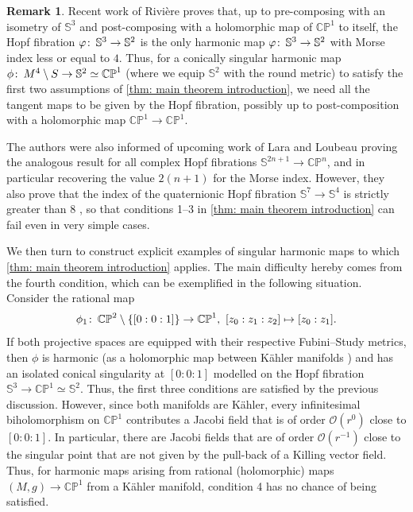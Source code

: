 \documentclass{article}
\numberwithin{equation}{section}        %
\theoremstyle{bfnote}
\theoremstyle{definition}
\theoremstyle{bfremark}
\newtheorem{rem}[thm]{Remark}               %
\newcommand{\col}{\colon \thinspace}        %
\newcommand{\Sp}{\mathbb{S}}                %
\begin{document}
\begin{rem}
    Recent work of Rivière \cite{Riviere2023HarmonicMapsS3toS2} proves that, up to pre-composing with an isometry of $\Sp^3$ and post-composing with a holomorphic map of $\mathbb{CP}^1$ to itself, the Hopf fibration $\varphi\col \Sp^3 \to \Sp^2$ is the only harmonic map $\varphi \col \Sp^3 \to \Sp^2$ with Morse index less or equal to $4$. Thus, for a conically singular harmonic map $\phi \col M^4\setminus S \to \Sp^2 \simeq \mathbb{CP}^1$ (where we equip $\Sp^2$ with the round metric) to satisfy the first two assumptions of \cref{thm: main theorem introduction}, we need all the tangent maps to be given by the Hopf fibration, possibly up to post-composition with a holomorphic map $\mathbb{CP}^1 \to \mathbb{CP}^1$. 
    
    The authors were also informed of upcoming work of Lara and Loubeau \cite{laraloubeau1} proving the analogous result for all complex Hopf fibrations $\Sp^{2n+1} \to \mathbb{CP}^n$, and in particular recovering the value $2(n+1)$ for the Morse index. However, they also prove that the index of the quaternionic Hopf fibration $\Sp^7 \to \Sp^4$ is strictly greater than $8$ \cite{laraloubeau2}, so that conditions 1--3 in \cref{thm: main theorem introduction} can fail even in very simple cases.
\end{rem}

We then turn to construct explicit examples of singular harmonic maps to which \cref{thm: main theorem introduction} applies. The main difficulty hereby comes from the fourth condition, which can be exemplified in the following situation. Consider the rational map
\begin{equation*}
    \phi_1 \col \mathbb{CP}^2\setminus \{[0:0:1]\} \to \mathbb{CP}^1, ~ [z_0:z_1:z_2] \mapsto [z_0:z_1]. 
\end{equation*}
If both projective spaces are equipped with their respective Fubini--Study metrics, then $\phi$ is harmonic (as a holomorphic map between Kähler manifolds \cite{eells1964harmonic}) and has an isolated conical singularity at $[0:0:1]$ modelled on the Hopf fibration $\Sp^3 \to \mathbb{CP}^1 \simeq \Sp^2$. Thus, the first three conditions are satisfied by the previous discussion. However, since both manifolds are Kähler, every infinitesimal biholomorphism on $\mathbb{CP}^1$ contributes a Jacobi field that is of order $\mathcal{O}(r^0)$ close to $[0:0:1]$. In particular, there are Jacobi fields that are of order $\mathcal{O}(r^{-1})$ close to the singular point that are not given by the pull-back of a Killing vector field. Thus, for harmonic maps arising from rational (holomorphic) maps $(M,g) \to \mathbb{CP}^1$ from a Kähler manifold, condition 4 has no chance of being satisfied. 
\end{document}
